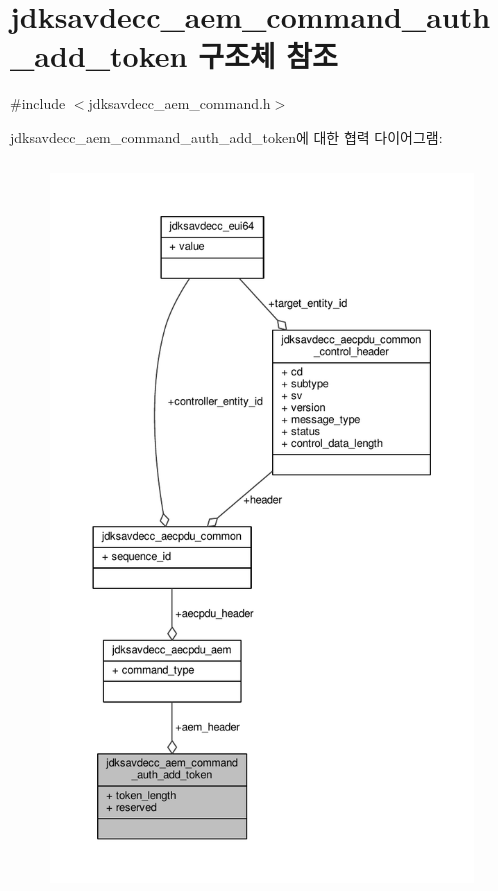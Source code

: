 \hypertarget{structjdksavdecc__aem__command__auth__add__token}{}\section{jdksavdecc\+\_\+aem\+\_\+command\+\_\+auth\+\_\+add\+\_\+token 구조체 참조}
\label{structjdksavdecc__aem__command__auth__add__token}


{\ttfamily \#include $<$jdksavdecc\+\_\+aem\+\_\+command.\+h$>$}



jdksavdecc\+\_\+aem\+\_\+command\+\_\+auth\+\_\+add\+\_\+token에 대한 협력 다이어그램\+:
\nopagebreak
\begin{figure}[H]
\begin{center}
\leavevmode
\includegraphics[height=550pt]{structjdksavdecc__aem__command__auth__add__token__coll__graph}
\end{center}
\end{figure}
